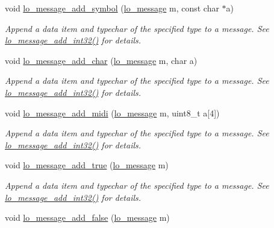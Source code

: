\begin{CompactItemize}
void \hyperlink{group__liblolowlevel_ga8e9583532819604e6b706e5d4a3cf1f}{lo\_\-message\_\-add\_\-symbol} (\hyperlink{lo__types_8h_d126083c98d941f00eb72d1690b38d63}{lo\_\-message} m, const char $\ast$a)
\begin{CompactList}\small\item\em Append a data item and typechar of the specified type to a message. See \hyperlink{group__liblolowlevel_g31ac1e4c0ec6c61f665ce3f9bbdc53c3}{lo\_\-message\_\-add\_\-int32()} for details. \item\end{CompactList}\item 
void \hyperlink{group__liblolowlevel_ga40601d4b2be072f4c7e63def43a062e}{lo\_\-message\_\-add\_\-char} (\hyperlink{lo__types_8h_d126083c98d941f00eb72d1690b38d63}{lo\_\-message} m, char a)
\begin{CompactList}\small\item\em Append a data item and typechar of the specified type to a message. See \hyperlink{group__liblolowlevel_g31ac1e4c0ec6c61f665ce3f9bbdc53c3}{lo\_\-message\_\-add\_\-int32()} for details. \item\end{CompactList}\item 
void \hyperlink{group__liblolowlevel_g4cd51119cad150e868987ba150a6b14b}{lo\_\-message\_\-add\_\-midi} (\hyperlink{lo__types_8h_d126083c98d941f00eb72d1690b38d63}{lo\_\-message} m, uint8\_\-t a\mbox{[}4\mbox{]})
\begin{CompactList}\small\item\em Append a data item and typechar of the specified type to a message. See \hyperlink{group__liblolowlevel_g31ac1e4c0ec6c61f665ce3f9bbdc53c3}{lo\_\-message\_\-add\_\-int32()} for details. \item\end{CompactList}\item 
void \hyperlink{group__liblolowlevel_g079bba28d38b8e5f83cc7498574eadb3}{lo\_\-message\_\-add\_\-true} (\hyperlink{lo__types_8h_d126083c98d941f00eb72d1690b38d63}{lo\_\-message} m)
\begin{CompactList}\small\item\em Append a data item and typechar of the specified type to a message. See \hyperlink{group__liblolowlevel_g31ac1e4c0ec6c61f665ce3f9bbdc53c3}{lo\_\-message\_\-add\_\-int32()} for details. \item\end{CompactList}\item 
void \hyperlink{group__liblolowlevel_g422d7d8c097533bbf035cd3dfbe1721e}{lo\_\-message\_\-add\_\-false} (\hyperlink{lo__types_8h_d126083c98d941f00eb72d1690b38d63}{lo\_\-message} m)

\end{CompactItemize}
